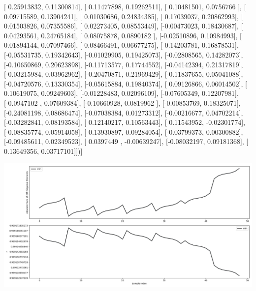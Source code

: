 \documentclass{article}
\begin{document}
       [ 0.25913832,  0.11300814],
       [ 0.11477898,  0.19262511],
       [ 0.10481501,  0.0756766 ],
       [ 0.09715589,  0.13904241],
       [ 0.01030686,  0.24834385],
       [ 0.17039037,  0.20862993],
       [ 0.01503826,  0.07355586],
       [ 0.02273405,  0.08553449],
       [-0.00473023,  0.18430687],
       [ 0.04293561,  0.24765184],
       [ 0.08075878,  0.0890182 ],
       [-0.02510896,  0.10984993],
       [ 0.01894144,  0.07097466],
       [ 0.08466491,  0.06677275],
       [ 0.14203781,  0.16878531],
       [-0.05531735,  0.19342643],
       [-0.01029905,  0.19425073],
       [-0.02808565,  0.14282073],
       [-0.10650869,  0.20623898],
       [-0.11713577,  0.17744552],
       [-0.04142394,  0.21317819],
       [-0.03215984,  0.03962962],
       [-0.20470871,  0.21969429],
       [-0.11837655,  0.05041088],
       [-0.04720576,  0.13330354],
       [-0.05615884,  0.19840374],
       [ 0.09126866,  0.06014502],
       [ 0.10619075,  0.09249603],
       [-0.01228483,  0.02096109],
       [-0.07605349,  0.12207981],
       [-0.0947102 ,  0.07609384],
       [-0.10660928,  0.0819962 ],
       [-0.00853769,  0.18325071],
       [-0.24081198,  0.08686474],
       [-0.07038384,  0.01273312],
       [-0.00216677,  0.04702214],
       [-0.03282841,  0.08193584],
       [ 0.12140217,  0.10563443],
       [ 0.11543952, -0.02301774],
       [-0.08835774,  0.05914058],
       [ 0.13930897,  0.09284054],
       [-0.03799373,  0.00300882],
       [-0.09485611,  0.02349523],
       [ 0.0397449 , -0.00639247],
       [-0.08032197,  0.09181368],
       [ 0.13649356,  0.03717101]])]
\begin{center}
\includegraphics[scale=.9]{report_pickled_controls121/control_dpn_all.png}

\end{center}
\end{document}
